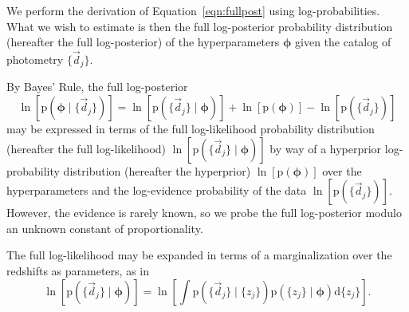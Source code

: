 \documentclass[iop]{emulateapj}
\newcommand{\Eq}[1]{Equation~\ref{#1}}
\newcommand{\data}{\ensuremath{\vec{d}}}%
\newcommand{\pr}[1]{\ensuremath{\mathrm{p}(#1)}}%
\newcommand{\gvn}{\mid}%
\newcommand{\integral}[2]{\ensuremath{\int #1 \mathrm{d} #2}}
\newcommand{\bvec}[1]{\ensuremath{\boldsymbol{#1}}}%
\newcommand{\ndphi}{\bvec{\phi}}
\begin{document}
We perform the derivation of \Eq{eqn:fullpost} using log-probabilities.  
What we wish to estimate is then the full log-posterior probability distribution (hereafter the full log-posterior) of the hyperparameters $\ndphi$ given the catalog of photometry $\{\data_{j}\}$.

By Bayes' Rule, the full log-posterior
\begin{equation}
\label{eqn:basicbayes}
\ln[\pr{\ndphi \gvn \{\data_{j}\}}] = \ln[\pr{\{\data_{j}\} \gvn \ndphi}] + \ln[\pr{\ndphi}] - \ln[\pr{\{\data_{j}\}}]
\end{equation}
may be expressed in terms of the full log-likelihood probability distribution (hereafter the full log-likelihood) $\ln[\pr{\{\data_{j}\} \gvn \ndphi}]$ by way of a hyperprior log-probability distribution (hereafter the hyperprior) $\ln[\pr{\ndphi}]$ over the hyperparameters and the log-evidence probability of the data $\ln[\pr{\{\data_{j}\}}]$.
However, the evidence is rarely known, so we probe the full log-posterior modulo an unknown constant of proportionality.

The full log-likelihood may be expanded in terms of a marginalization over the redshifts as parameters, as in 
\begin{equation}
\label{eqn:marginalize}
\ln[\pr{\{\data_{j}\} \gvn \ndphi}] = \ln\left[\integral{\pr{\{\data_{j}\} \gvn \{z_{j}\}} \pr{\{z_{j}\} \gvn \ndphi}}{\{z_{j}\}}\right].
\end{equation}
\end{document}
